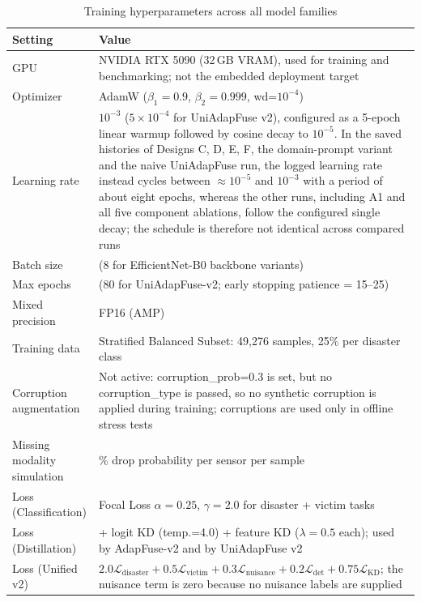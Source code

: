 \begin{table}[H]
\centering
\caption[Training hyperparameters]{Training hyperparameters across all model families}
\label{tab:training}
\begin{tabular}{@{}l>{\raggedright\arraybackslash}p{9.2cm}@{}}
\toprule
\textbf{Setting} & \textbf{Value} \\
\midrule
GPU & NVIDIA RTX 5090 (32\,GB VRAM), used for training and benchmarking; not the embedded deployment target \\
Optimizer & AdamW ($\beta_1=0.9$, $\beta_2=0.999$, wd=$10^{-4}$) \\
Learning rate & $10^{-3}$ ($5\times10^{-4}$ for UniAdapFuse v2), configured as a 5-epoch linear warmup followed by cosine decay to $10^{-5}$. In the saved histories of Designs C, D, E, F, the domain-prompt variant and the naive UniAdapFuse run, the logged learning rate instead cycles between $\approx10^{-5}$ and $10^{-3}$ with a period of about eight epochs, whereas the other runs, including A1 and all five component ablations, follow the configured single decay; the schedule is therefore not identical across compared runs \\
Batch size & 16 (8 for EfficientNet-B0 backbone variants) \\
Max epochs & 50 (80 for UniAdapFuse-v2; early stopping patience = 15--25) \\
Mixed precision & FP16 (AMP) \\
Training data & Stratified Balanced Subset: 49{,}276 samples, 25\% per disaster class \\
Corruption augmentation & Not active: corruption\_prob=0.3 is set, but no corruption\_type is passed, so no synthetic corruption is applied during training; corruptions are used only in offline stress tests \\
Missing modality simulation & 20\% drop probability per sensor per sample \\
Loss (Classification) & Focal Loss $\alpha=0.25$, $\gamma=2.0$ for disaster + victim tasks \\
Loss (Distillation) & + logit KD (temp.=4.0) + feature KD ($\lambda=0.5$ each); used by AdapFuse-v2 and by UniAdapFuse v2 \\
Loss (Unified v2) & $2.0 \mathcal{L}_{\text{disaster}} + 0.5 \mathcal{L}_{\text{victim}} + 0.3 \mathcal{L}_{\text{nuisance}} + 0.2 \mathcal{L}_{\text{det}} + 0.75 \mathcal{L}_{\text{KD}}$; the nuisance term is zero because no nuisance labels are supplied \\
\bottomrule
\end{tabular}
\end{table}

